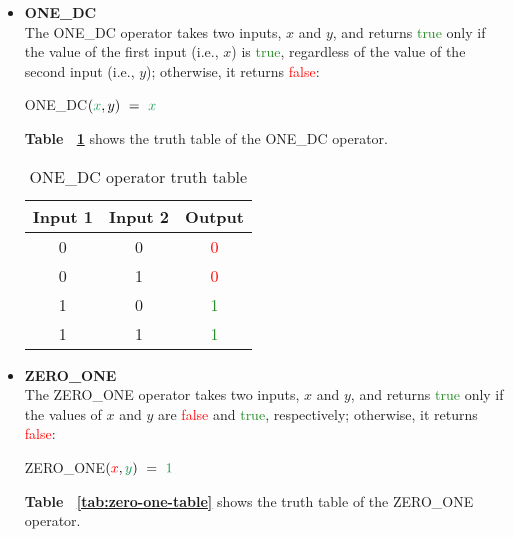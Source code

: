 \documentclass[]{usiinfbachelorproject}
\begin{document}
\begin{itemize}
    \item \textbf{ONE\_DC}
        \vspace{0.2cm} \\
        The ONE\_DC operator takes two inputs, $x$ and $y$, and returns \textcolor{ForestGreen}{true} only if the value of the first input (i.e., $x$) is \textcolor{ForestGreen}{true}, regardless of the value of the second input (i.e., $y$); otherwise, it returns \textcolor{red}{false}:
        \begin{center}
            ONE\_DC$(\textcolor{ForestGreen}{x}, y) \ = \ \textcolor{ForestGreen}{x}$
        \end{center}
        \textbf{Table ~\ref{tab:one-dc-table}} shows the truth table of the ONE\_DC operator.
        \begin{table}[H]
            \centering
            \begin{tabular}{|c|c|c|}
                \hline
                \textbf{Input 1} & \textbf{Input 2} & \textbf{Output} \\ \hline
                0 & 0 & \textcolor{red}{0} \\
                \hline
                0 & 1 & \textcolor{red}{0} \\
                \hline
                1 & 0 & \textcolor{ForestGreen}{1} \\
                \hline
                1 & 1 & \textcolor{ForestGreen}{1} \\
                \hline
            \end{tabular}
            \caption{ONE\_DC operator truth table}
            \label{tab:one-dc-table}
        \end{table}
    \item \textbf{ZERO\_ONE}
        \vspace{0.2cm} \\
        The ZERO\_ONE operator takes two inputs, $x$ and $y$, and returns \textcolor{ForestGreen}{true} only if the values of $x$ and $y$ are \textcolor{red}{false} and \textcolor{ForestGreen}{true}, respectively; otherwise, it returns \textcolor{red}{false}:
        \begin{center}
            ZERO\_ONE$(\textcolor{red}{x}, \textcolor{ForestGreen}{y})\ =\ \textcolor{ForestGreen}{1}$
        \end{center}
        \textbf{Table ~\ref{tab:zero-one-table}} shows the truth table of the ZERO\_ONE operator.
        \begin{table}[H]
            \centering
            \begin{tabular}{|c|c|c|}

\end{tabular}
\end{table}
\end{itemize}
\end{document}
